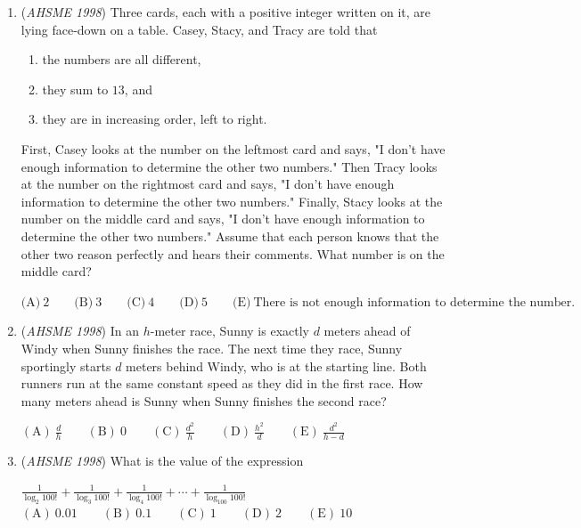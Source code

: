 \begin{enumerate}
 $\mathrm{(A) \ }0 \qquad \mathrm{(B) \ }2 \qquad \mathrm{(C) \ }4 \qquad \mathrm{(D) \ }6 \qquad \mathrm{(E) \ } 8$


	\item (\textit{AHSME 1998}) Three cards, each with a positive integer written on it, are lying face-down on a table. Casey, Stacy, and Tracy are told that


 
            \begin{enumerate}[label=(\roman*)]
                \item  the numbers are all different,
\item  they sum to $13$, and
\item  they are in increasing order, left to right.
            \end{enumerate}
            First, Casey looks at the number on the leftmost card and says, "I don't have enough information to determine the other two numbers."  Then Tracy looks at the number on the rightmost card and says, "I don't have enough information to determine the other two numbers."  Finally, Stacy looks at the number on the middle card and says, "I don't have enough information to determine the other two numbers."  Assume that each person knows that the other two reason perfectly and hears their comments.  What number is on the middle card?


 $\textrm{(A)}\ 2 \qquad \textrm{(B)}\ 3 \qquad \textrm{(C)}\ 4 \qquad \textrm{(D)}\ 5 \qquad \textrm{(E)}\ \text{There is not enough information to determine the number.}$


	\item (\textit{AHSME 1998}) In an $h$-meter race, Sunny is exactly $d$ meters ahead of Windy when Sunny finishes the race. The next time they race, Sunny sportingly starts $d$ meters behind Windy, who is at the starting line. Both runners run at the same constant speed as they did in the first race. How many meters ahead is Sunny when Sunny finishes the second race?


 $\mathrm{(A) \ } \frac dh \qquad \mathrm{(B) \ } 0 \qquad \mathrm{(C) \ } \frac {d^2}h \qquad \mathrm{(D) \ } \frac {h^2}d \qquad \mathrm{(E) \ } \frac{d^2}{h-d}$


	\item (\textit{AHSME 1998}) What is the value of the expression


 $\frac {1}{\log_{2}100!} + \frac {1}{\log_{3}100!} + \frac {1}{\log_{4}100!} + \cdots + \frac {1}{\log_{100}100!}$
$\mathrm{(A) \ }0.01 \qquad \mathrm{(B) \ }0.1 \qquad \mathrm{(C) \ }1 \qquad \mathrm{(D) \ }2 \qquad \mathrm{(E) \ } 10$



\end{enumerate}
